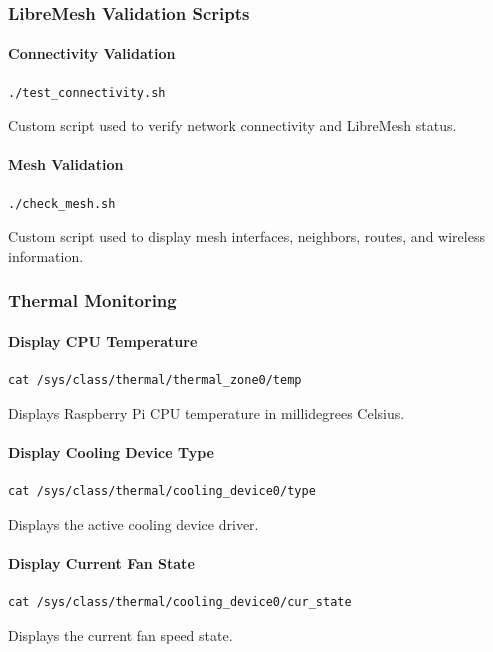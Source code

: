\documentclass[conference]{IEEEtran}
\begin{document}
\subsubsection{LibreMesh Validation Scripts}

\paragraph{Connectivity Validation}
\begin{verbatim}
./test_connectivity.sh
\end{verbatim}
Custom script used to verify network connectivity and LibreMesh status.

\paragraph{Mesh Validation}
\begin{verbatim}
./check_mesh.sh
\end{verbatim}
Custom script used to display mesh interfaces, neighbors, routes, and wireless information.

\subsubsection{Thermal Monitoring}

\paragraph{Display CPU Temperature}
\begin{verbatim}
cat /sys/class/thermal/thermal_zone0/temp
\end{verbatim}
Displays Raspberry Pi CPU temperature in millidegrees Celsius.

\paragraph{Display Cooling Device Type}
\begin{verbatim}
cat /sys/class/thermal/cooling_device0/type
\end{verbatim}
Displays the active cooling device driver.

\paragraph{Display Current Fan State}
\begin{verbatim}
cat /sys/class/thermal/cooling_device0/cur_state
\end{verbatim}
Displays the current fan speed state.
\end{document}
